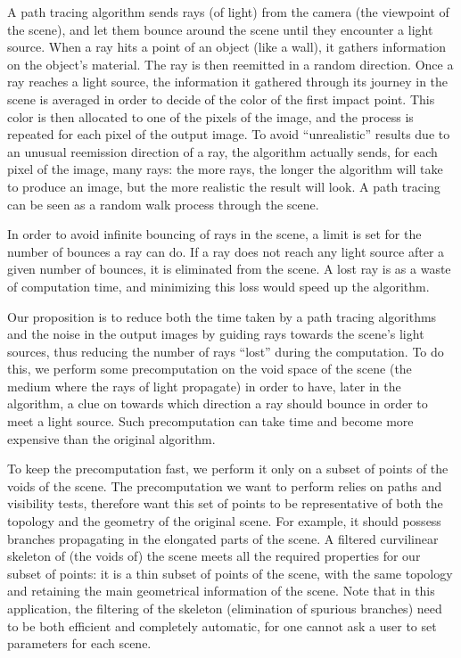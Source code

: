 \documentclass[final,envcountsame]{llncs}
\def\quotes#1{``#1''}
\begin{document}
A path tracing algorithm sends rays (of light) from the camera (the viewpoint of the scene), and let them bounce around the scene until they encounter a light source. When a ray hits a point of an object (like a wall), it gathers information on the object's material. The ray is then reemitted in a random direction. Once a ray reaches a light source, the information it gathered through its journey in the scene is averaged in order to decide of the color of the first impact point. This color is then allocated to one of the pixels of the image, and the process is repeated for each pixel of the output image. To avoid \quotes{unrealistic} results due to an unusual reemission direction of a ray, the algorithm actually sends, for each pixel of the image, many rays: the more rays, the longer the algorithm will take to produce an image, but the more realistic the result will look. A path tracing can be seen as a random walk process through the scene.

In order to avoid infinite bouncing of rays in the scene, a limit is set for the number of bounces a ray can do. If a ray does not reach any light source after a given number of bounces, it is eliminated from the scene. A lost ray is as a waste of computation time, and minimizing this loss would speed up the algorithm.

Our proposition is to reduce both the time taken by a path tracing algorithms and the noise in the output images by guiding rays towards the scene's light sources, thus reducing the number of rays \quotes{lost} during the computation. To do this, we perform some precomputation on the void space of the scene (the medium where the rays of light propagate) in order to have, later in the algorithm, a clue on towards which direction a ray should bounce in order to meet a light source. Such precomputation can take time and become more expensive than the original algorithm.

To keep the precomputation fast, we perform it only on a subset of points of the voids of the scene. The precomputation we want to perform relies on paths and visibility tests, therefore want this set of points to be representative of both the topology and the geometry of the original scene. For example, it should possess branches propagating in the elongated parts of the scene. A filtered curvilinear skeleton of (the voids of) the scene meets all the required properties for our subset of points: it is a thin subset of points of the scene, with the same topology and retaining the main geometrical information of the scene. Note that in this application, the filtering of the skeleton (elimination of spurious branches) need to be both efficient and completely automatic, for one cannot ask a user to set parameters for each scene. 
\end{document}
